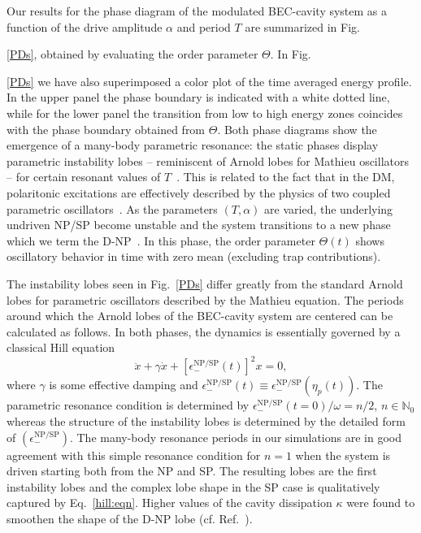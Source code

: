 \documentclass[aps,prl,twocolumn,superscriptaddress,groupedaddress]{revtex4}  %
\begin{document}
Our results for the phase diagram of the modulated BEC-cavity system as a function of the drive amplitude $\alpha$ and period $T$ are summarized in Fig.~{\ref{PDs}, obtained by evaluating the order 
parameter $\Theta$. In Fig.~{\ref{PDs} we have also superimposed a color plot of the time averaged energy profile. In the upper panel the phase boundary is indicated with a white dotted line, 
while for the lower panel the transition from low to high energy zones coincides with the phase boundary obtained from $\Theta$.
Both phase diagrams show the emergence of a many-body parametric resonance: the static phases display parametric instability lobes -- reminiscent of  Arnold lobes for Mathieu oscillators -- 
for certain resonant values of $T$~\cite{HillsEq, mclachlan}. 
This is related to the fact that in the DM, polaritonic excitations are effectively described by the physics of two coupled parametric oscillators~\cite{supmat}. 
As the parameters $(T,\alpha)$ are varied, the underlying undriven NP/SP become unstable and the system transitions to a new phase which we term the D-NP~\cite{Chitra:2015}. 
In this phase,  the order parameter $\Theta(t)$ shows oscillatory behavior in time with zero mean (excluding trap contributions). 
 
The instability lobes seen in Fig.~\ref{PDs} differ greatly from the standard Arnold lobes for parametric oscillators described by the Mathieu equation. 
The periods around which the Arnold lobes of the BEC-cavity system are centered can be calculated as follows. In both phases, the dynamics is essentially governed by a classical 
Hill equation~\cite{HillsEq, supmat}
\begin{equation}
\ddot{x} + \gamma \dot{x} +  [\epsilon_-^{\textrm{NP/SP}}(t)]^2 x = 0 ,
\label{hill:eqn}
\end{equation}
where $\gamma$ is some effective damping and $ \epsilon_-^{\textrm{NP/SP}}(t)\equiv \epsilon_-^{\textrm{NP/SP}}(\eta_p (t))$.  
The parametric resonance condition is determined by $\epsilon_-^{\textrm{NP/SP}}(t=0) / \omega = n / 2$, $n \in \mathbb{N}_0$ whereas the structure of the instability lobes is determined 
by the detailed form of $(\epsilon_-^{\textrm{NP/SP}})$. The many-body resonance periods in our simulations are in good agreement with this simple resonance condition for $n=1$ when the 
system is driven starting both from the NP and SP. The resulting lobes are the first instability lobes and the complex lobe shape in the SP case is qualitatively captured by 
Eq.~\eqref{hill:eqn}. Higher values of  the cavity dissipation $\kappa$ were found to smoothen the shape of the D-NP lobe (cf. Ref.~\cite{supmat}).


}}
\end{document}
